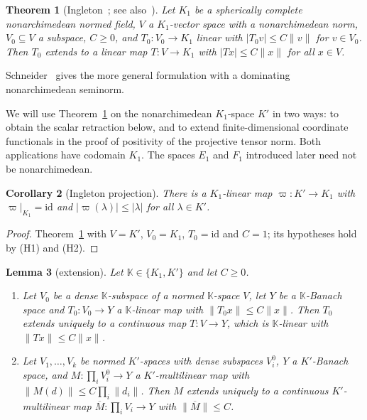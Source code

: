 \documentclass[11pt]{amsart}
\newtheorem{theorem}{Theorem}[section]
\newtheorem{lemma}[theorem]{Lemma}
\newtheorem{corollary}[theorem]{Corollary}
\theoremstyle{definition}
\theoremstyle{remark}
\numberwithin{equation}{section}
\newcommand{\id}{\mathrm{id}}
\newcommand{\abs}[1]{\lvert #1\rvert}
\newcommand{\norm}[1]{\lVert #1\rVert}
\begin{document}
\begin{theorem}[Ingleton~\cite{In}; see also~\cite{vR}]\label{thm:ingleton}
Let $K_1$ be a spherically complete nonarchimedean normed field, $V$ a $K_1$\nobreakdash-vector space with a nonarchimedean norm,
$V_0\subseteq V$ a subspace, $C\ge0$, and $T_0\colon V_0\to K_1$ linear with $\abs{T_0v}\le C\norm v$ for $v\in V_0$. Then
$T_0$ extends to a linear map $T\colon V\to K_1$ with $\abs{Tx}\le C\norm x$ for all $x\in V$.
\end{theorem}

Schneider~\cite[Prop.~9.2]{Sch} gives the more general formulation with a dominating nonarchimedean seminorm.

We will use Theorem~\ref{thm:ingleton} on the nonarchimedean $K_1$\nobreakdash-space $K'$ in two ways: to obtain the scalar
retraction below, and to extend finite-dimensional coordinate functionals in the proof of positivity of the
projective tensor norm. Both applications have codomain $K_1$. The spaces $E_1$ and $F_1$ introduced later need not
be nonarchimedean.

\begin{corollary}[Ingleton projection]\label{cor:proj}
There is a $K_1$\nobreakdash-linear map $\varpi\colon K'\to K_1$ with $\varpi|_{K_1}=\id$ and $\abs{\varpi(\lambda)}\le\abs\lambda$ for all
$\lambda\in K'$.
\end{corollary}

\begin{proof}
Theorem~\ref{thm:ingleton} with $V=K'$, $V_0=K_1$, $T_0=\id$ and $C=1$; its hypotheses hold by (H1) and (H2).
\end{proof}

\begin{samepage}
\begin{lemma}[extension]\label{lem:ext}
Let $\mathbb K\in\{K_1,K'\}$ and let $C\ge0$.
\begin{enumerate}
\item Let $V_0$ be a dense $\mathbb K$\nobreakdash-subspace of a normed $\mathbb K$\nobreakdash-space $V$, let $Y$ be a
$\mathbb K$\nobreakdash-Banach space and $T_0\colon V_0\to Y$ a $\mathbb K$\nobreakdash-linear map with $\norm{T_0x}\le C\norm x$. Then $T_0$ extends
uniquely to a continuous map $T\colon V\to Y$, which is $\mathbb K$\nobreakdash-linear with $\norm{Tx}\le C\norm x$.
\item Let $V_1,\dots,V_k$ be normed $K'$\nobreakdash-spaces with dense subspaces $V_i^0$, $Y$ a $K'$\nobreakdash-Banach space, and
$M\colon\prod_iV_i^0\to Y$ a $K'$\nobreakdash-multilinear map with $\norm{M(d)}\le C\prod_i\norm{d_i}$. Then $M$ extends uniquely to a
continuous $K'$\nobreakdash-multilinear map $\overline M\colon\prod_iV_i\to Y$ with $\norm{\overline M}\le C$.
\end{enumerate}
\end{lemma}
\end{samepage}
\end{document}
